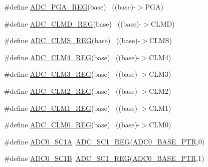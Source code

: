 \begin{DoxyCompactItemize}
\#define \hyperlink{group___a_d_c___register___accessor___macros_ga7e77b8e64203db15c157e72b2b4285ee}{A\+D\+C\+\_\+\+P\+G\+A\+\_\+\+R\+EG}(base)                                            ~((base)-\/$>$P\+GA)
\item 
\#define \hyperlink{group___a_d_c___register___accessor___macros_ga42b9eb64ac35d5b5dafcdf46cdaa5da6}{A\+D\+C\+\_\+\+C\+L\+M\+D\+\_\+\+R\+EG}(base)                                          ~((base)-\/$>$C\+L\+MD)
\item 
\#define \hyperlink{group___a_d_c___register___accessor___macros_gaebae30a3ca641d11bf4827c16cf97f40}{A\+D\+C\+\_\+\+C\+L\+M\+S\+\_\+\+R\+EG}(base)                                          ~((base)-\/$>$C\+L\+MS)
\item 
\#define \hyperlink{group___a_d_c___register___accessor___macros_ga9c3a854d793a88e2311f1f03b687e3e0}{A\+D\+C\+\_\+\+C\+L\+M4\+\_\+\+R\+EG}(base)                                          ~((base)-\/$>$C\+L\+M4)
\item 
\#define \hyperlink{group___a_d_c___register___accessor___macros_ga97002f7666f0790f47fc6bd12a083246}{A\+D\+C\+\_\+\+C\+L\+M3\+\_\+\+R\+EG}(base)                                          ~((base)-\/$>$C\+L\+M3)
\item 
\#define \hyperlink{group___a_d_c___register___accessor___macros_ga46547eb78fef1573713d39b1d8c578d5}{A\+D\+C\+\_\+\+C\+L\+M2\+\_\+\+R\+EG}(base)                                          ~((base)-\/$>$C\+L\+M2)
\item 
\#define \hyperlink{group___a_d_c___register___accessor___macros_gac5ca17b6333853551a5367159766f482}{A\+D\+C\+\_\+\+C\+L\+M1\+\_\+\+R\+EG}(base)                                          ~((base)-\/$>$C\+L\+M1)
\item 
\#define \hyperlink{group___a_d_c___register___accessor___macros_ga8d8e7a000934e8d6f37a0e6f8175de9e}{A\+D\+C\+\_\+\+C\+L\+M0\+\_\+\+R\+EG}(base)                                          ~((base)-\/$>$C\+L\+M0)
\item 
\#define \hyperlink{group___a_d_c___register___accessor___macros_ga4ec61cea717b410cadc80c71f4c81664}{A\+D\+C0\+\_\+\+S\+C1A}~\hyperlink{group___a_d_c___register___accessor___macros_ga222b4f9dbc62d3e7cdc7fab81d736b1f}{A\+D\+C\+\_\+\+S\+C1\+\_\+\+R\+EG}(\hyperlink{group___a_d_c___peripheral_ga6cec2f227a3a37a9fccaa830740f1f5e}{A\+D\+C0\+\_\+\+B\+A\+S\+E\+\_\+\+P\+TR},0)
\item 
\#define \hyperlink{group___a_d_c___register___accessor___macros_ga9a83b6b66f4db147b1c3f952e62b57d5}{A\+D\+C0\+\_\+\+S\+C1B}~\hyperlink{group___a_d_c___register___accessor___macros_ga222b4f9dbc62d3e7cdc7fab81d736b1f}{A\+D\+C\+\_\+\+S\+C1\+\_\+\+R\+EG}(\hyperlink{group___a_d_c___peripheral_ga6cec2f227a3a37a9fccaa830740f1f5e}{A\+D\+C0\+\_\+\+B\+A\+S\+E\+\_\+\+P\+TR},1)

\end{DoxyCompactItemize}
